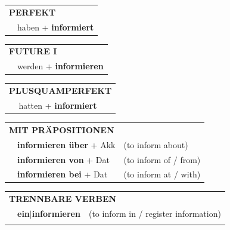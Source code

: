 \documentclass[10pt,a4paper]{revtex4-2}
\begin{document}
\begin{verbbox}
 \begin{tabular}{rl}
     \multicolumn{2}{l}{\textbf{PERFEKT}}\\
   & haben + \textbf{informiert}\\
  \end{tabular}
\hfill
\begin{tabular}{rl}
    \multicolumn{2}{l}{\textbf{FUTURE I}}\\
   & werden + \textbf{informieren}\\
  \end{tabular}
\hfill
\begin{tabular}{rl}
    \multicolumn{2}{l}{\textbf{PLUSQUAMPERFEKT}}\\
   & hatten + \textbf{informiert}\\
  \end{tabular}

 \vspace{10pt}

\begin{tabular}{lll}
      \multicolumn{3}{l}{\textbf{MIT PRÄPOSITIONEN}}\\
& \textbf{informieren über} + Akk & (to inform about)\\
& \textbf{informieren von} + Dat & (to inform of / from)\\
& \textbf{informieren bei} + Dat & (to inform at / with)\\
\end{tabular}
  \hfill
\begin{tabular}{lll}
      \multicolumn{3}{l}{\textbf{TRENNBARE VERBEN}}\\
 & \textbf{ein$|$informieren} & (to inform in / register information)\\
\vspace{20pt}
  \end{tabular}


\vspace{-5pt}
\end{verbbox}
\end{document}
